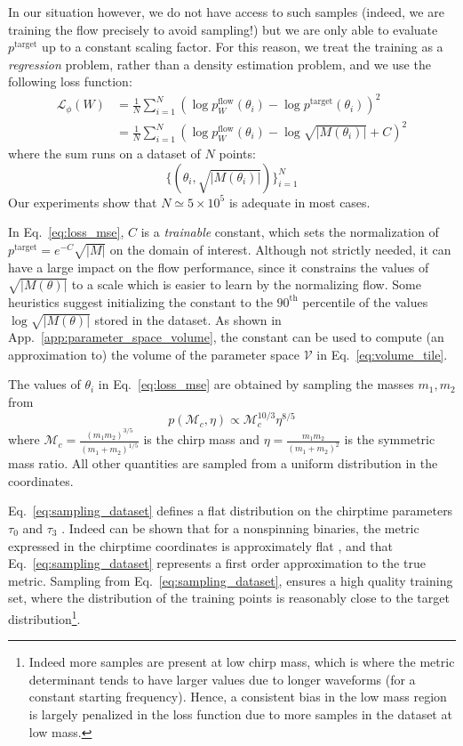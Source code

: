 \documentclass[twocolumn,showpacs,preprintnumbers,nofootinbib,prd,
superscriptaddress,10pt]{revtex4-2}
\begin{document}
In our situation however, we do not have access to such samples (indeed, we are training the flow precisely to avoid sampling!) but we are only able to evaluate $p^\text{target}$ up to a constant scaling factor.
For this reason, we treat the training as a {\it regression} problem, rather than a density estimation problem, and we use the following loss function:
%
\begin{align}\label{eq:loss_mse}
	\mathcal{L}_\phi(W) &= \frac{1}{N} \sum_{i=1}^N \left(\log p^\text{flow}_W(\theta_i) - \log p^\text{target}(\theta_i) \right)^2 \nonumber\\
						&= \frac{1}{N} \sum_{i=1}^N \left(\log p^\text{flow}_W(\theta_i) - \log\sqrt{|M(\theta_i)|} + C \right)^2
\end{align}
%
where the sum runs on a dataset of $N$ points:
\begin{equation}
	\{(\theta_i, \sqrt{|M(\theta_i)|})\}_{i=1}^N
\end{equation}
Our experiments show that ${N \simeq 5 \times 10^5}$ is adequate in most cases.

In Eq.~\eqref{eq:loss_mse}, $C$ is a {\it trainable} constant, which sets the normalization of $p^\text{target} = e^{-C} \sqrt{|M|}$ on the domain of interest.
Although not strictly needed, it can have a large impact on the flow performance, since it constrains the values of $\sqrt{|M(\theta)|}$ to a scale which is easier to learn by the normalizing flow.
Some heuristics suggest initializing the constant to the $90^\text{th}$ percentile of the values $\log \sqrt{|M(\theta)|}$ stored in the dataset.
As shown in App.~\ref{app:parameter_space_volume}, the constant can be used to compute (an approximation to) the volume of the parameter space $\mathcal{V}$ in Eq.~\eqref{eq:volume_tile}.

The values of $\theta_i$ in Eq.~\eqref{eq:loss_mse} are obtained by sampling the masses $m_1, m_2$ from
\begin{equation}\label{eq:sampling_dataset}
	p(\mathcal{M}_c, \eta) \propto \mathcal{M}_c^{10/3} \eta^{8/5}
\end{equation}
where $\mathcal{M}_c = \frac{(m_1m_2)^{3/5}}{(m_1+m_2)^{1/5}}$ is the chirp mass and $\eta = \frac{m_1m_2}{(m_1+m_2)^2}$ is the symmetric mass ratio.
All other quantities are sampled from a uniform distribution in the coordinates.

Eq.~\eqref{eq:sampling_dataset} defines a flat distribution on the chirptime parameters $\tau_0$ and $\tau_3$ \cite{Cokelaer:2007kx}. Indeed can be shown that for a nonspinning binaries, the metric expressed in the chirptime coordinates is approximately flat \cite{Sathyaprakash:1991mt, Dhurandhar:1992mw}, and that Eq.~\eqref{eq:sampling_dataset} represents a first order approximation to the true metric.
Sampling from Eq.~\eqref{eq:sampling_dataset}, ensures a high quality training set, where the distribution of the training points is reasonably close to the target distribution\footnote{Indeed more samples are present at low chirp mass, which is where the metric determinant tends to have larger values due to longer waveforms (for a constant starting frequency). Hence, a consistent bias in the low mass region is largely penalized in the loss function due to more samples in the dataset at low mass.}.
\end{document}
